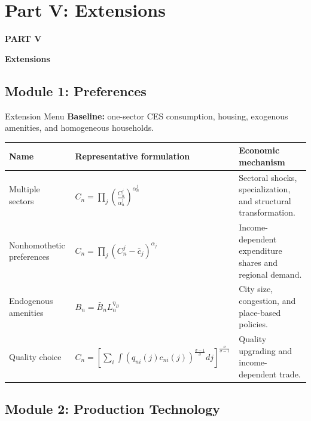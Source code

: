 \documentclass[aspectratio=169,11pt]{beamer}
\newcommand{\B}[1]{\textcolor{blue1}{\textbf{#1}}}
\newcommand{\partdivider}[2]{%
  \begin{frame}[plain]
    \vfill
    \begin{center}
      {\color{deepred}\Large\bfseries PART #1\par}
      \vspace{0.75em}
      {\color{oxfordblue}\LARGE\bfseries #2\par}
    \end{center}
    \vfill
  \end{frame}}
\begin{document}
\section{Part V: Extensions}

\partdivider{V}{Extensions}

\setcounter{subsection}{0}

\subsection{Module 1: Preferences}

\begin{frame}{Extension Menu}
  \scriptsize
  \setlength{\tabcolsep}{3pt}
  \B{Baseline:} one-sector CES consumption, housing, exogenous amenities,
  and homogeneous households.

  \smallskip
  \renewcommand{\arraystretch}{1.15}
  \begin{center}
  \begin{tabular}{
    >{\raggedright\arraybackslash}p{}
    >{\centering\arraybackslash}p{}
    >{\raggedright\arraybackslash}p{}}
    \toprule
    Name & Representative formulation & Economic mechanism \\
    \midrule
    Multiple sectors
      & \(\displaystyle
          C_n=\prod_j\left(\frac{C_n^j}{\alpha_n^j}\right)^{\alpha_n^j}\)
      & Sectoral shocks, specialization, and structural transformation. \\
    \addlinespace[2pt]
    Nonhomothetic preferences
      & \(\displaystyle C_n=\prod_j(C_n^j-\bar c_j)^{\alpha_j}\)
      & Income-dependent expenditure shares and regional demand. \\
    \addlinespace[2pt]
    Endogenous amenities
      & \(\displaystyle B_n=\bar B_nL_n^{\eta_B}\)
      & City size, congestion, and place-based policies. \\
    \addlinespace[2pt]
    Quality choice
      & \(\displaystyle
          C_n=\left[\sum_i\int
          (q_{ni}(j)c_{ni}(j))^{\frac{\sigma-1}{\sigma}}dj
          \right]^{\frac{\sigma}{\sigma-1}}\)
      & Quality upgrading and income-dependent trade. \\
    \bottomrule
  \end{tabular}
  \end{center}
\end{frame}

\subsection{Module 2: Production Technology}
\end{document}
